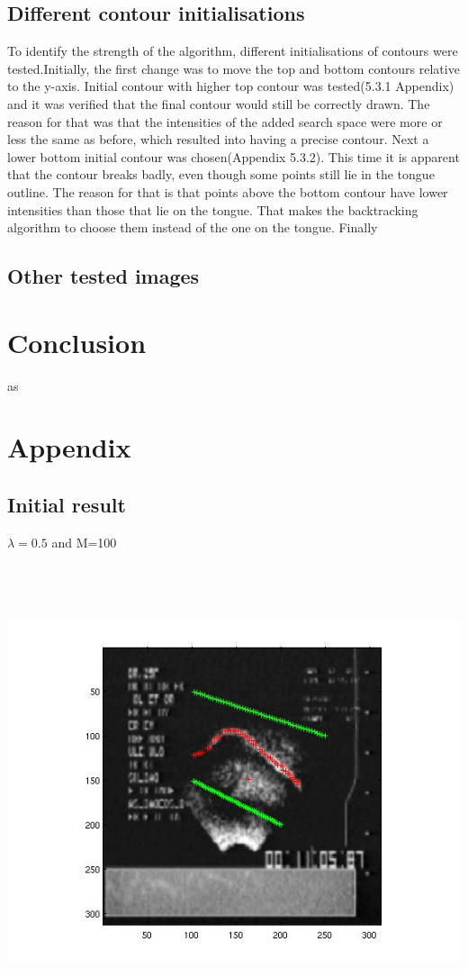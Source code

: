 \documentclass[12pt,a4paper,twocolumn]{article}
\begin{document}
\subsection{Different contour initialisations}
To identify the strength of the algorithm, different initialisations of contours were tested.Initially, the first change was to move the top and bottom contours relative to the y-axis. Initial contour with higher top contour was tested(5.3.1 Appendix) and it was verified that the final contour would still be correctly drawn. The reason for that was that the intensities of the added search space were more or less the same as before, which resulted into having a precise contour. Next a lower bottom initial contour was chosen(Appendix 5.3.2). This time it is apparent that the contour breaks badly, even though some points still lie in the tongue outline. The reason for that is that points above the bottom contour have lower intensities than those that lie on the tongue. That makes the backtracking algorithm to choose them instead of the one on the tongue.
Finally
\subsection{Other tested images}
\section{Conclusion}
as
\newpage
\mbox{}

\newpage
\mbox{}
\section{Appendix}
\subsection{Initial result}
$\lambda=0.5$ and M=100
\newline
\includegraphics[width=500pt,height=400pt,scale=1]{points_1_to_7.jpg}
\newpage
\mbox{}
\newpage
\end{document}

